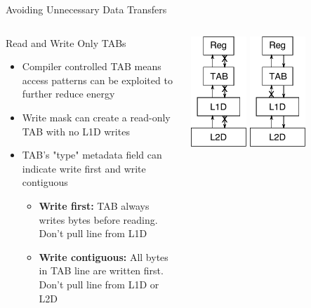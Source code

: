 \documentclass{beamer}
\begin{document}
\begin{frame}{Avoiding Unnecessary Data Transfers}
   \begin{columns}
      \begin{block}{Read and Write Only TABs}
         \begin{itemize}
            \item Compiler controlled TAB means access patterns can be exploited to 
               further reduce energy
            \item Write mask can create a read-only TAB with no L1D writes
            \item TAB's "type" metadata field can indicate write first and write contiguous
               \begin{itemize}
                  \item \textbf{Write first:} TAB always writes bytes before reading.
                     Don't pull line from L1D
                  \item \textbf{Write contiguous:} All bytes in TAB line are written 
                     first. Don't pull line from L1D or L2D
               \end{itemize}
         \end{itemize}
      \end{block}
      \includegraphics[width=0.33\textwidth]{figures/memorytransfer_readonly.pdf}
      \includegraphics[width=0.33\textwidth]{figures/memorytransfer_writefirst.pdf}

\end{columns}
\end{frame}
\end{document}
